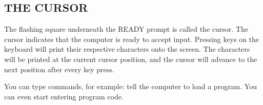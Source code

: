 \subsection{THE CURSOR}

The flashing square underneath the READY prompt is called the cursor. The cursor indicates that the computer is ready to accept input. Pressing keys on the keyboard will print their respective characters onto the screen. The characters will be printed at the current cursor position, and the cursor will advance to the next position after every key press.

You can type commands, for example: tell the computer to load a program. You can even start entering program code.
